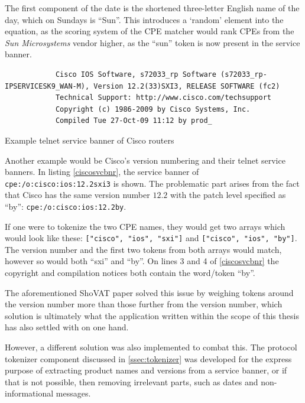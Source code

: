 \documentclass[a4paper,12pt]{article}
\begin{document}
	The first component of the date is the shortened three-letter English name of the day, which on Sundays is ``Sun''. This introduces a `random' element into the equation, as the scoring system of the CPE matcher would rank CPEs from the \textit{Sun Microsystems} vendor higher, as the ``sun'' token is now present in the service banner.
	
	\begin{listing}[H]
		\begin{verbatim}
			Cisco IOS Software, s72033_rp Software (s72033_rp-IPSERVICESK9_WAN-M), Version 12.2(33)SXI3, RELEASE SOFTWARE (fc2)
			Technical Support: http://www.cisco.com/techsupport
			Copyright (c) 1986-2009 by Cisco Systems, Inc.
			Compiled Tue 27-Oct-09 11:12 by prod_
		\end{verbatim}
		\caption{Example telnet service banner of Cisco routers}
		\label{ciscosvcbnr}
	\end{listing}

	Another example would be Cisco's version numbering and their telnet service banners. In listing \ref{ciscosvcbnr}, the service banner of \texttt{cpe:/o:cisco:ios:12.2sxi3} is shown. The problematic part arises from the fact that Cisco has the same version number $12.2$ with the patch level specified as ``by'': \texttt{cpe:/o:cisco:ios:12.2by}.
	
	If one were to tokenize the two CPE names, they would get two arrays which would look like these: \texttt{["cisco", "ios", "sxi"]} and \texttt{["cisco", "ios", "by"]}. The version number and the first two tokens from both arrays would match, however so would both ``sxi'' and ``by''. On lines 3 and 4 of \ref{ciscosvcbnr} the copyright and compilation notices both contain the word/token ``by''.

	The aforementioned ShoVAT\cite{shovat15} paper solved this issue by weighing tokens around the version number more than those further from the version number, which solution is ultimately what the application written within the scope of this thesis has also settled with on one hand.
	
	However, a different solution was also implemented to combat this. The protocol tokenizer component discussed in \ref{ssec:tokenizer} was developed for the express purpose of extracting product names and versions from a service banner, or if that is not possible, then removing irrelevant parts, such as dates and non-informational messages.
		
\end{document}
